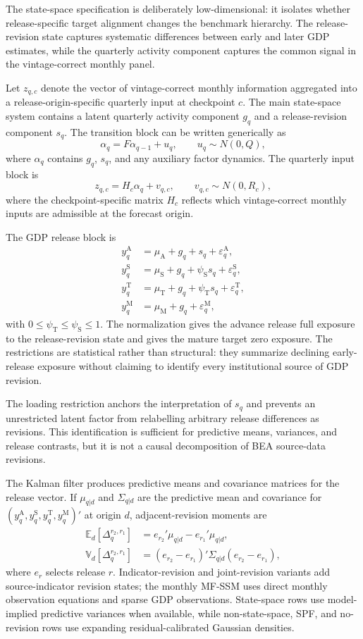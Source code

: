 \documentclass[12pt]{article}
\newcommand{\Arel}{\mathrm{A}}
\newcommand{\Srel}{\mathrm{S}}
\newcommand{\Trel}{\mathrm{T}}
\newcommand{\Mrel}{\mathrm{M}}
\begin{document}
The state-space specification is deliberately low-dimensional: it isolates whether release-specific target alignment changes the benchmark hierarchy. The release-revision state captures systematic differences between early and later GDP estimates, while the quarterly activity component captures the common signal in the vintage-correct monthly panel.

Let $z_{q,c}$ denote the vector of vintage-correct monthly information aggregated into a release-origin-specific quarterly input at checkpoint $c$. The main state-space system contains a latent quarterly activity component $g_q$ and a release-revision component $s_q$. The transition block can be written generically as
\[
\alpha_q = F\alpha_{q-1}+u_q, \qquad u_q\sim N(0,Q),
\]
where $\alpha_q$ contains $g_q$, $s_q$, and any auxiliary factor dynamics. The quarterly input block is
\[
z_{q,c}=H_c\alpha_q+v_{q,c}, \qquad v_{q,c}\sim N(0,R_c),
\]
where the checkpoint-specific matrix $H_c$ reflects which vintage-correct monthly inputs are admissible at the forecast origin.

The GDP release block is
\begin{align}
 y_q^{\Arel} &= \mu_{\Arel}+g_q+s_q+\varepsilon_q^{\Arel}, \\
 y_q^{\Srel} &= \mu_{\Srel}+g_q+\psi_{\Srel}s_q+\varepsilon_q^{\Srel}, \\
 y_q^{\Trel} &= \mu_{\Trel}+g_q+\psi_{\Trel}s_q+\varepsilon_q^{\Trel}, \\
 y_q^{\Mrel} &= \mu_{\Mrel}+g_q+\varepsilon_q^{\Mrel},
\end{align}
with $0\leq \psi_{\Trel}\leq \psi_{\Srel}\leq 1$. The normalization gives the advance release full exposure to the release-revision state and gives the mature target zero exposure. The restrictions are statistical rather than structural: they summarize declining early-release exposure without claiming to identify every institutional source of GDP revision.

The loading restriction anchors the interpretation of $s_q$ and prevents an unrestricted latent factor from relabelling arbitrary release differences as revisions. This identification is sufficient for predictive means, variances, and release contrasts, but it is not a causal decomposition of BEA source-data revisions.

The Kalman filter produces predictive means and covariance matrices for the release vector. If $\mu_{q|d}$ and $\Sigma_{q|d}$ are the predictive mean and covariance for $(y_q^{\Arel},y_q^{\Srel},y_q^{\Trel},y_q^{\Mrel})'$ at origin $d$, adjacent-revision moments are
\begin{align}
\mathbb E_d[\Delta_q^{r_2,r_1}] &= e_{r_2}'\mu_{q|d}-e_{r_1}'\mu_{q|d}, \\
\mathbb V_d[\Delta_q^{r_2,r_1}] &= (e_{r_2}-e_{r_1})'\Sigma_{q|d}(e_{r_2}-e_{r_1}),
\end{align}
where $e_r$ selects release $r$. Indicator-revision and joint-revision variants add source-indicator revision states; the monthly MF-SSM uses direct monthly observation equations and sparse GDP observations. State-space rows use model-implied predictive variances when available, while non-state-space, SPF, and no-revision rows use expanding residual-calibrated Gaussian densities.
\end{document}
